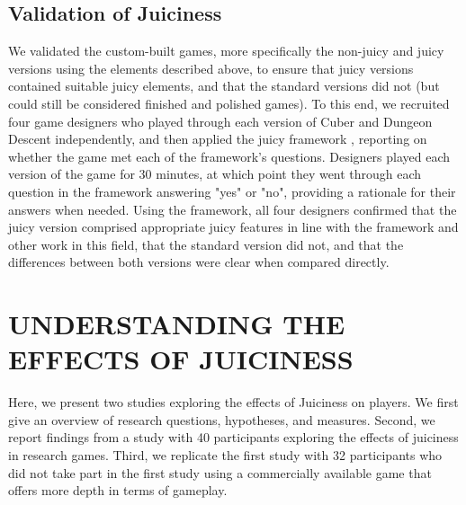\documentclass{sigchi}
\begin{document}
\subsection{Validation of Juiciness}
We validated the custom-built games, more specifically the non-juicy and juicy versions using the elements described above, to ensure that juicy versions contained suitable juicy elements, and that the standard versions did not (but could still be considered finished and polished games). To this end, we recruited four game designers who played through each version of Cuber and Dungeon Descent independently, and then applied the juicy framework \cite{hicks2018juicy}, reporting on whether the game met each of the framework's questions. Designers played each version of the game for 30 minutes, at which point they went through each question in the framework answering "yes" or "no", providing a rationale for their answers when needed. Using the framework, all four designers confirmed that the juicy version comprised appropriate juicy features in line with the framework and other work in this field, that the standard version did not, and that the differences between both versions were clear when compared directly.  
 
\section{UNDERSTANDING THE EFFECTS OF JUICINESS}
Here, we present two studies exploring the effects of Juiciness on players. We first give an overview of research questions, hypotheses, and measures. Second, we report findings from a study with 40 participants exploring the effects of juiciness in research games. Third, we replicate the first study with 32 participants who did not take part in the first study using a commercially available game that offers more depth in terms of gameplay.
\end{document}
